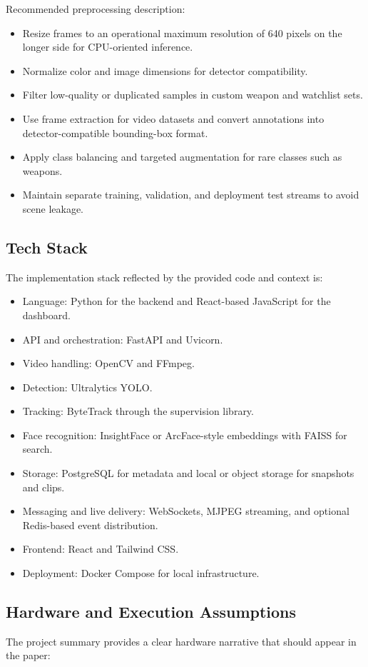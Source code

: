 \documentclass[11pt]{article}
\begin{document}
Recommended preprocessing description:

\begin{itemize}
\item Resize frames to an operational maximum resolution of 640 pixels on the longer side for CPU-oriented inference.
\item Normalize color and image dimensions for detector compatibility.
\item Filter low-quality or duplicated samples in custom weapon and watchlist sets.
\item Use frame extraction for video datasets and convert annotations into detector-compatible bounding-box format.
\item Apply class balancing and targeted augmentation for rare classes such as weapons.
\item Maintain separate training, validation, and deployment test streams to avoid scene leakage.
\end{itemize}

\subsection{Tech Stack}
The implementation stack reflected by the provided code and context is:

\begin{itemize}
\item Language: Python for the backend and React-based JavaScript for the dashboard.
\item API and orchestration: FastAPI and Uvicorn.
\item Video handling: OpenCV and FFmpeg.
\item Detection: Ultralytics YOLO.
\item Tracking: ByteTrack through the supervision library.
\item Face recognition: InsightFace or ArcFace-style embeddings with FAISS for search.
\item Storage: PostgreSQL for metadata and local or object storage for snapshots and clips.
\item Messaging and live delivery: WebSockets, MJPEG streaming, and optional Redis-based event distribution.
\item Frontend: React and Tailwind CSS.
\item Deployment: Docker Compose for local infrastructure.
\end{itemize}

\subsection{Hardware and Execution Assumptions}
The project summary provides a clear hardware narrative that should appear in the paper:
\end{document}
